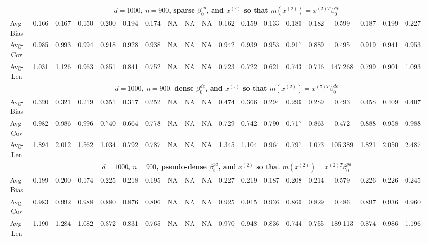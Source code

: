 \documentclass[ejsv2,noshowframe]{imsart}
\theoremstyle{plain}
\theoremstyle{definition}
\theoremstyle{remark}
\begin{document}
\begin{table}[hbtp!]
\begin{center}
{\begin{tabular}{ccccccccccccccccccc}
		& \multicolumn{18}{c}{\bf $d=1000$, $n = 900$, sparse $\beta_0^{sp}$, and $x^{(2)}$ so that $m(x^{(2)})=x^{(2)T}\beta_0^{sp}$} \\ \cline{2-19}
		Avg-Bias & 0.166 & 0.167 & 0.150 & 0.200 & 0.194 & 0.174 & NA & NA & NA & 0.162 & 0.159 & 0.133 & 0.180 & 0.182 & 0.599 & 0.187 & 0.199 & 0.227 \\
		Avg-Cov & 0.985 & 0.993 & 0.994 & 0.918 & 0.928 & 0.938 & NA & NA & NA & 0.942 & 0.939 & 0.953 & 0.917 & 0.889 & 0.495 & 0.919 & 0.941 & 0.953 \\
		Avg-Len & 1.031 & 1.126 & 0.963 & 0.851 & 0.841 & 0.752 & NA & NA & NA & 0.723 & 0.722 & 0.621 & 0.743 & 0.716 & 147.268 & 0.799 & 0.901 & 1.093 \\
		\cline{2-19}
		
		& \multicolumn{18}{c}{\bf $d=1000$, $n = 900$, dense $\beta_0^{de}$, and $x^{(2)}$ so that $m(x^{(2)})=x^{(2)T}\beta_0^{de}$} \\ \cline{2-19}
		Avg-Bias & 0.320 & 0.321 & 0.219 & 0.351 & 0.317 & 0.252 & NA & NA & NA & 0.474 & 0.366 & 0.294 & 0.296 & 0.289 & 0.493 & 0.458 & 0.409 & 0.407 \\
		Avg-Cov & 0.982 & 0.986 & 0.996 & 0.740 & 0.664 & 0.778 & NA & NA & NA & 0.729 & 0.742 & 0.790 & 0.717 & 0.863 & 0.472 & 0.888 & 0.958 & 0.988 \\
		Avg-Len & 1.894 & 2.012 & 1.562 & 1.034 & 0.792 & 0.787 & NA & NA & NA & 1.345 & 1.104 & 0.964 & 0.797 & 1.073 & 105.389 & 1.821 & 2.050 & 2.487 \\
		\cline{2-19}
		
		& \multicolumn{18}{c}{\bf $d=1000$, $n = 900$, pseudo-dense $\beta_0^{pd}$, and $x^{(2)}$ so that $m(x^{(2)})=x^{(2)T}\beta_0^{pd}$} \\ \cline{2-19}
		Avg-Bias & 0.199 & 0.200 & 0.174 & 0.225 & 0.218 & 0.195 & NA & NA & NA & 0.227 & 0.219 & 0.187 & 0.208 & 0.214 & 0.579 & 0.226 & 0.226 & 0.245 \\
		Avg-Cov & 0.983 & 0.992 & 0.988 & 0.880 & 0.876 & 0.896 & NA & NA & NA & 0.925 & 0.915 & 0.936 & 0.860 & 0.829 & 0.486 & 0.897 & 0.936 & 0.960 \\
		Avg-Len & 1.190 & 1.284 & 1.082 & 0.872 & 0.831 & 0.765 & NA & NA & NA & 0.970 & 0.948 & 0.836 & 0.744 & 0.755 & 189.113 & 0.874 & 0.986 & 1.196 \\
		\hline
		

\end{tabular}}
\end{center}
\end{table}
\end{document}
